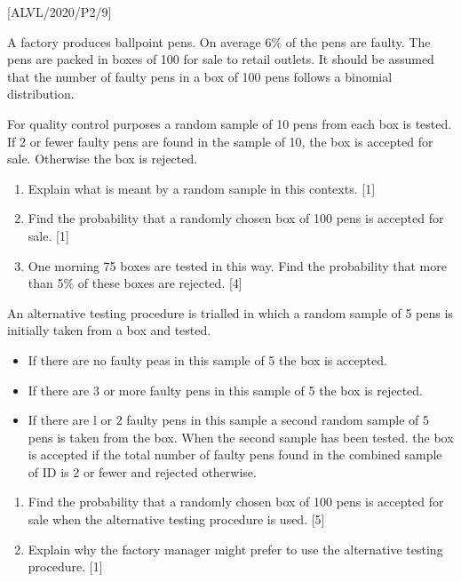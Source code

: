 \item {[}ALVL/2020/P2/9{]}

A factory produces ballpoint pens. On average 6\% of the pens are
faulty. The pens are packed in boxes of 100 for sale to retail outlets.
It should be assumed that the number of faulty pens in a box of 100
pens follows a binomial distribution. 

For quality control purposes a random sample of 10 pens from each
box is tested. If 2 or fewer faulty pens are found in the sample of
10, the box is accepted for sale. Otherwise the box is rejected. 
\begin{enumerate}
\item Explain what is meant by a random sample in this contexts. \hfill{}{[}1{]}
\item Find the probability that a randomly chosen box of 100 pens is accepted
for sale. \hfill{}{[}1{]}
\item One morning 75 boxes are tested in this way. Find the probability
that more than 5\% of these boxes are rejected. \hfill{}{[}4{]}
\end{enumerate}
An alternative testing procedure is trialled in which a random sample
of 5 pens is initially taken from a box and tested.
\begin{itemize}
\item If there are no faulty peas in this sample of 5 the box is accepted.
\item If there are 3 or more faulty pens in this sample of 5 the box is
rejected.
\item If there are l or 2 faulty pens in this sample a second random sample
of 5 pens is taken from the box. When the second sample has been tested.
the box is accepted if the total number of faulty pens found in the
combined sample of ID is 2 or fewer and rejected otherwise.
\end{itemize}
\begin{enumerate}
\item Find the probability that a randomly chosen box of 100 pens is accepted
for sale when the alternative testing procedure is used. \hfill{}{[}5{]}
\item Explain why the factory manager might prefer to use the alternative
testing procedure. \hfill{}{[}1{]}
\end{enumerate}
